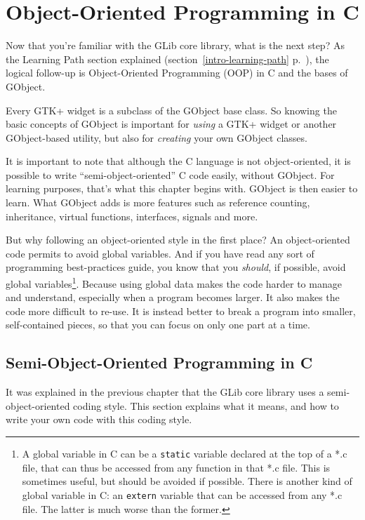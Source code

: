 \chapter{Object-Oriented Programming in C}
\label{oop}

Now that you're familiar with the GLib core library, what is the next step? As the Learning Path section explained (section~\ref{intro-learning-path} p.~\pageref{intro-learning-path}), the logical follow-up is Object-Oriented Programming (OOP) in C and the bases of GObject.

Every GTK+ widget is a subclass of the GObject base class. So knowing the basic concepts of GObject is important for \emph{using} a GTK+ widget or another GObject-based utility, but also for \emph{creating} your own GObject classes.

It is important to note that although the C language is not object-oriented, it is possible to write ``semi-object-oriented'' C code easily, without GObject. For learning purposes, that's what this chapter begins with. GObject is then easier to learn. What GObject adds is more features such as reference counting, inheritance, virtual functions, interfaces, signals and more.

But why following an object-oriented style in the first place? An object-oriented code permits to avoid global variables. And if you have read any sort of programming best-practices guide, you know that you \emph{should}, if possible, avoid global variables\footnote{A global variable in C can be a \lstinline{static} variable declared at the top of a *.c file, that can thus be accessed from any function in that *.c file. This is sometimes useful, but should be avoided if possible. There is another kind of global variable in C: an \lstinline{extern} variable that can be accessed from any *.c file. The latter is much worse than the former.}. Because using global data makes the code harder to manage and understand, especially when a program becomes larger. It also makes the code more difficult to re-use. It is instead better to break a program into smaller, self-contained pieces, so that you can focus on only one part at a time.

\section{Semi-Object-Oriented Programming in C}

It was explained in the previous chapter that the GLib core library uses a semi-object-oriented coding style. This section explains what it means, and how to write your own code with this coding style.

